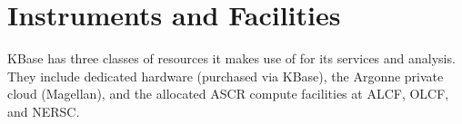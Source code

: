 \documentclass[10pt,a4paper]{report}
\begin{document}
\section{Instruments and Facilities}

KBase has three classes of resources it makes use of for its services and analysis.  They include dedicated hardware (purchased via KBase), the Argonne private cloud (Magellan), and the allocated ASCR compute facilities at ALCF, OLCF, and NERSC.  
\end{document}
